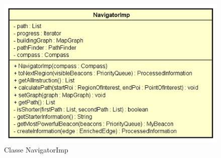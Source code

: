 \documentclass[../DefinizioneDiProdotto.tex]{subfiles}
\begin{document}
    \begin{figure}[H]
        \centering
        \includegraphics{img/NavigatorImp.png}
        \caption{Classe NavigatorImp}\label{fig:model::navigator::NavigatorImp} 
    \end{figure}
\end{document}
